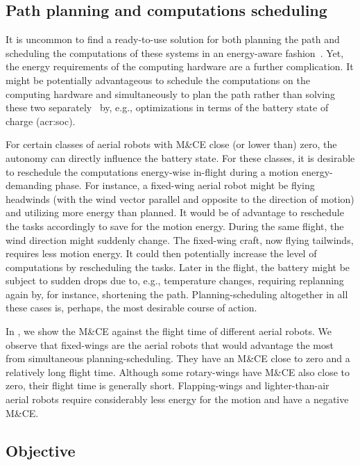 \subsection{Path planning and computations scheduling}

It is uncommon to find a ready-to-use solution for both planning the path and scheduling the computations of these systems in an energy-aware fashion~\citep{brateman2006energy,sudhakar2020balancing}. Yet, the energy requirements of the computing hardware are a further complication. It might be potentially advantageous to schedule the computations on the computing hardware and simultaneously to plan the path rather than solving these two separately~\citep{lahijanian2018resource,ondruska2015scheduled} by, e.g., optimizations in terms of the battery state of charge (\Gls{acr:soc}). 

For certain classes of aerial robots with M\&CE close (or lower than) zero, the autonomy can directly influence the battery state. For these classes, it is desirable to reschedule the computations energy-wise in-flight during a motion energy-demanding phase. For instance, a fixed-wing aerial robot might be flying headwinds (with the wind vector parallel and opposite to the direction of motion) and utilizing more energy than planned. It would be of advantage to reschedule the tasks accordingly to save for the motion energy. During the same flight, the wind direction might suddenly change. The fixed-wing craft, now flying tailwinds, requires less motion energy. It could then potentially increase the level of computations by rescheduling the tasks. Later in the flight, the battery might be subject to sudden drops due to, e.g., temperature changes, requiring replanning again by, for instance, shortening the path. Planning-scheduling altogether in all these cases is, perhaps, the most desirable course of action.

In , we show the M\&CE against the flight time of different aerial robots. We observe that fixed-wings are the aerial robots that would advantage the most from simultaneous planning-scheduling. They have an M\&CE close to zero and a relatively long flight time. Although some rotary-wings have M\&CE also close to zero, their flight time is generally short. Flapping-wings and lighter-than-air aerial robots require considerably less energy for the motion and have a negative M\&CE.

\subsection{Objective}
\label{sec:objective}

